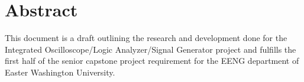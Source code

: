 \section{Abstract}
	This document is a draft outlining the research and development done for the Integrated Oscilloscope/Logic Analyzer/Signal Generator project and fulfills the first half of the senior capstone project requirement for the EENG department of Easter Washington University. 
